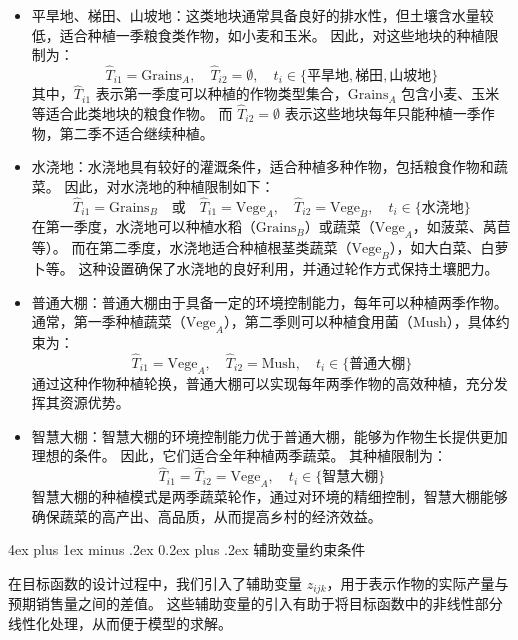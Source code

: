 \documentclass[12pt,a4paper]{nmmcm}
\makeatletter
\renewcommand\subsubsection{\@startsection{subsubsection}{3}{1em}%
  {4ex plus 1ex minus .2ex}%
  {0.2ex plus .2ex}%
  {\normalfont\large\bfseries}}
\makeatother
\begin{document}
\begin{itemize}
  \item 平旱地、梯田、山坡地：这类地块通常具备良好的排水性，但土壤含水量较低，适合种植一季粮食类作物，如小麦和玉米。
        因此，对这些地块的种植限制为：
        \[
          \hat{T}_{i1} = \text{Grains}_A, \quad \hat{T}_{i2} = \emptyset, \quad t_i \in \{\text{平旱地}, \text{梯田}, \text{山坡地}\}
        \]
        其中，$\hat{T}_{i1}$ 表示第一季度可以种植的作物类型集合，$\text{Grains}_A$ 包含小麦、玉米等适合此类地块的粮食作物。
        而 $\hat{T}_{i2} = \emptyset$ 表示这些地块每年只能种植一季作物，第二季不适合继续种植。


  \item 水浇地：水浇地具有较好的灌溉条件，适合种植多种作物，包括粮食作物和蔬菜。
        因此，对水浇地的种植限制如下：
        \[
          \hat{T}_{i1} = \text{Grains}_B \quad \text{或} \quad \hat{T}_{i1} = \text{Vege}_A, \quad \hat{T}_{i2} = \text{Vege}_B, \quad t_i \in \{\text{水浇地}\}
        \]
        在第一季度，水浇地可以种植水稻（$\text{Grains}_B$）或蔬菜（$\text{Vege}_A$，如菠菜、莴苣等）。
        而在第二季度，水浇地适合种植根茎类蔬菜（$\text{Vege}_B$），如大白菜、白萝卜等。
        这种设置确保了水浇地的良好利用，并通过轮作方式保持土壤肥力。


  \item 普通大棚：普通大棚由于具备一定的环境控制能力，每年可以种植两季作物。
        通常，第一季种植蔬菜（$\text{Vege}_A$），第二季则可以种植食用菌（$\text{Mush}$），具体约束为：
        \[
          \hat{T}_{i1} = \text{Vege}_A, \quad \hat{T}_{i2} = \text{Mush}, \quad t_i \in \{\text{普通大棚}\}
        \]
        通过这种作物种植轮换，普通大棚可以实现每年两季作物的高效种植，充分发挥其资源优势。


  \item 智慧大棚：智慧大棚的环境控制能力优于普通大棚，能够为作物生长提供更加理想的条件。
        因此，它们适合全年种植两季蔬菜。
        其种植限制为：
        \[
          \hat{T}_{i1} = \hat{T}_{i2} = \text{Vege}_A, \quad t_i \in \{\text{智慧大棚}\}
        \]
        智慧大棚的种植模式是两季蔬菜轮作，通过对环境的精细控制，智慧大棚能够确保蔬菜的高产出、高品质，从而提高乡村的经济效益。

\end{itemize}

\subsubsection{辅助变量约束条件}

在目标函数的设计过程中，我们引入了辅助变量 $z_{ijk}$，用于表示作物的实际产量与预期销售量之间的差值。
这些辅助变量的引入有助于将目标函数中的非线性部分线性化处理，从而便于模型的求解。
\end{document}
